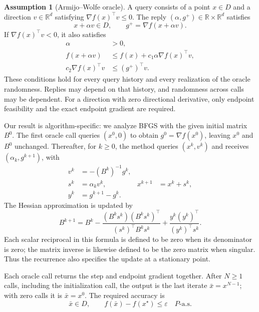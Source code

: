 \documentclass[10pt]{article}
\theoremstyle{definition}
\newtheorem{assumption}{Assumption}
\begin{document}
\begin{assumption}[Armijo--Wolfe oracle]
A query consists of a point $x\in D$ and a direction $v\in\mathbb{R}^d$ satisfying $\nabla f(x)^\top v\leq0$. The reply $(\alpha,g^+)\in\mathbb{R}\times\mathbb{R}^d$ satisfies
\[
x+\alpha v\in D,
\qquad g^+=\nabla f(x+\alpha v).
\]
If $\nabla f(x)^\top v<0$, it also satisfies
\[
\begin{aligned}
\alpha&>0,\\
f(x+\alpha v)&\leq f(x)+c_1\alpha\nabla f(x)^\top v,\\
c_2\nabla f(x)^\top v&\leq (g^+)^\top v.
\end{aligned}
\]
These conditions hold for every query history and every realization of the oracle randomness. Replies may depend on that history, and randomness across calls may be dependent. For a direction with zero directional derivative, only endpoint feasibility and the exact endpoint gradient are required.
\end{assumption}

Our result is algorithm-specific: we analyze BFGS with the given initial matrix $B^0$. The first oracle call queries $(x^0,0)$ to obtain $g^0=\nabla f(x^0)$, leaving $x^0$ and $B^0$ unchanged. Thereafter, for $k\geq0$, the method queries $(x^k,v^k)$ and receives $(\alpha_k,g^{k+1})$, with
\[
\begin{aligned}
v^k&=-(B^k)^{-1}g^k,\\
s^k&=\alpha_k v^k, & x^{k+1}&=x^k+s^k,\\
y^k&=g^{k+1}-g^k.
\end{aligned}
\]
The Hessian approximation is updated by
\[
B^{k+1}=B^k
-\frac{(B^k s^k)(B^k s^k)^\top}{(s^k)^\top B^k s^k}
+\frac{y^k(y^k)^\top}{(y^k)^\top s^k}.
\]
Each scalar reciprocal in this formula is defined to be zero when its denominator is zero; the matrix inverse is likewise defined to be the zero matrix when singular. Thus the recurrence also specifies the update at a stationary point.

Each oracle call returns the step and endpoint gradient together. After $N\geq1$ calls, including the initialization call, the output is the last iterate $\bar{x}=x^{N-1}$; with zero calls it is $\bar{x}=x^0$. The required accuracy is
\[
\bar{x}\in D,
\qquad f(\bar{x})-f(x^\star)\leq\varepsilon
\quad P\text{-a.s.}
\]
\end{document}
